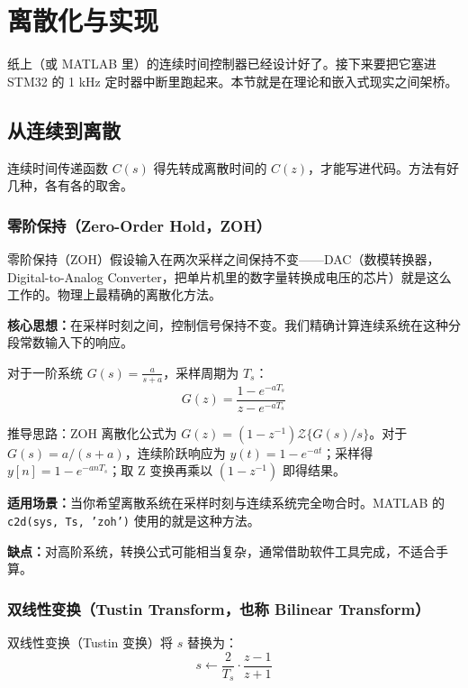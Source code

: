 \section{离散化与实现}

纸上（或 MATLAB 里）的连续时间控制器已经设计好了。接下来要把它塞进 STM32 的 1 kHz 定时器中断里跑起来。本节就是在理论和嵌入式现实之间架桥。

\subsection{从连续到离散}

连续时间传递函数 $C(s)$ 得先转成离散时间的 $C(z)$，才能写进代码。方法有好几种，各有各的取舍。

\subsubsection{零阶保持（Zero-Order Hold，ZOH）}

零阶保持（ZOH）假设输入在两次采样之间保持不变——DAC（数模转换器，Digital-to-Analog Converter，把单片机里的数字量转换成电压的芯片）就是这么工作的。物理上最精确的离散化方法。

\textbf{核心思想：}在采样时刻之间，控制信号保持不变。我们精确计算连续系统在这种分段常数输入下的响应。

对于一阶系统 $G(s) = \frac{a}{s + a}$，采样周期为 $T_s$：
\begin{equation}
G(z) = \frac{1 - e^{-aT_s}}{z - e^{-aT_s}}
\end{equation}

推导思路：ZOH 离散化公式为 $G(z) = (1-z^{-1})\mathcal{Z}\{G(s)/s\}$。对于 $G(s) = a/(s+a)$，连续阶跃响应为 $y(t) = 1 - e^{-at}$；采样得 $y[n] = 1 - e^{-anT_s}$；取 Z 变换再乘以 $(1-z^{-1})$ 即得结果。

\textbf{适用场景：}当你希望离散系统在采样时刻与连续系统完全吻合时。MATLAB 的 \texttt{c2d(sys, Ts, 'zoh')} 使用的就是这种方法。

\textbf{缺点：}对高阶系统，转换公式可能相当复杂，通常借助软件工具完成，不适合手算。

\subsubsection{双线性变换（Tustin Transform，也称 Bilinear Transform）}

双线性变换（Tustin 变换）将 $s$ 替换为：
\begin{equation}
s \leftarrow \frac{2}{T_s} \cdot \frac{z - 1}{z + 1}
\end{equation}

